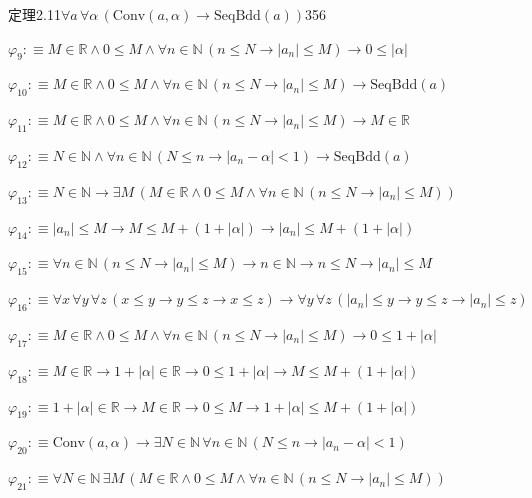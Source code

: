 \begin{fullproof}{定理2.11}{$\forall a\,\forall \alpha\,(\mathrm{Conv}(a,\alpha) \to \mathrm{SeqBdd}(a))$}{356}
\begin{abbrevlist}
\item $\varphi_{9} :\equiv M \in \mathbb{R} \land 0 \leq M \land \forall n \in \mathbb{N}\,(n \leq N \to \lvert a_{n} \rvert \leq M) \to 0 \leq \lvert \alpha \rvert$
\item $\varphi_{10} :\equiv M \in \mathbb{R} \land 0 \leq M \land \forall n \in \mathbb{N}\,(n \leq N \to \lvert a_{n} \rvert \leq M) \to \mathrm{SeqBdd}(a)$
\item $\varphi_{11} :\equiv M \in \mathbb{R} \land 0 \leq M \land \forall n \in \mathbb{N}\,(n \leq N \to \lvert a_{n} \rvert \leq M) \to M \in \mathbb{R}$
\item $\varphi_{12} :\equiv N \in \mathbb{N} \land \forall n \in \mathbb{N}\,(N \leq n \to \lvert a_{n} - \alpha \rvert < 1) \to \mathrm{SeqBdd}(a)$
\item $\varphi_{13} :\equiv N \in \mathbb{N} \to \exists M\,(M \in \mathbb{R} \land 0 \leq M \land \forall n \in \mathbb{N}\,(n \leq N \to \lvert a_{n} \rvert \leq M))$
\item $\varphi_{14} :\equiv \lvert a_{n} \rvert \leq M \to M \leq M + (1 + \lvert \alpha \rvert) \to \lvert a_{n} \rvert \leq M + (1 + \lvert \alpha \rvert)$
\item $\varphi_{15} :\equiv \forall n \in \mathbb{N}\,(n \leq N \to \lvert a_{n} \rvert \leq M) \to n \in \mathbb{N} \to n \leq N \to \lvert a_{n} \rvert \leq M$
\item $\varphi_{16} :\equiv \forall x\,\forall y\,\forall z\,(x \leq y \to y \leq z \to x \leq z) \to \forall y\,\forall z\,(\lvert a_{n} \rvert \leq y \to y \leq z \to \lvert a_{n} \rvert \leq z)$
\item $\varphi_{17} :\equiv M \in \mathbb{R} \land 0 \leq M \land \forall n \in \mathbb{N}\,(n \leq N \to \lvert a_{n} \rvert \leq M) \to 0 \leq 1 + \lvert \alpha \rvert$
\item $\varphi_{18} :\equiv M \in \mathbb{R} \to 1 + \lvert \alpha \rvert \in \mathbb{R} \to 0 \leq 1 + \lvert \alpha \rvert \to M \leq M + (1 + \lvert \alpha \rvert)$
\item $\varphi_{19} :\equiv 1 + \lvert \alpha \rvert \in \mathbb{R} \to M \in \mathbb{R} \to 0 \leq M \to 1 + \lvert \alpha \rvert \leq M + (1 + \lvert \alpha \rvert)$
\item $\varphi_{20} :\equiv \mathrm{Conv}(a,\alpha) \to \exists N \in \mathbb{N}\,\forall n \in \mathbb{N}\,(N \leq n \to \lvert a_{n} - \alpha \rvert < 1)$
\item $\varphi_{21} :\equiv \forall N \in \mathbb{N}\,\exists M\,(M \in \mathbb{R} \land 0 \leq M \land \forall n \in \mathbb{N}\,(n \leq N \to \lvert a_{n} \rvert \leq M))$

\end{abbrevlist}
\end{fullproof}
